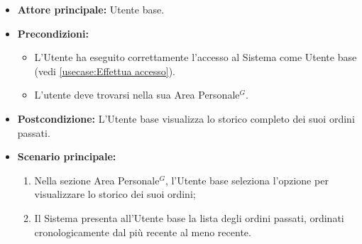 \label{usecase:Storico ordini}
\begin{itemize}
	\item \textbf{Attore principale:} Utente base.

	\item \textbf{Precondizioni:}
	      \begin{itemize}
		      \item L'Utente ha eseguito correttamente l'accesso al Sistema come Utente base (vedi \autoref{usecase:Effettua accesso}).
		      \item L'utente deve trovarsi nella sua Area Personale$^G$.
	      \end{itemize}

	\item \textbf{Postcondizione:} L'Utente base visualizza lo storico completo dei suoi ordini passati.

	\item \textbf{Scenario principale:}
	      \begin{enumerate}
		      \item Nella sezione Area Personale$^G$, l'Utente base seleziona l'opzione per visualizzare lo storico dei suoi ordini;
		      \item Il Sistema presenta all'Utente base la lista degli ordini passati, ordinati cronologicamente dal più recente al meno recente.
	      \end{enumerate}
\end{itemize}

